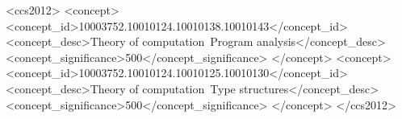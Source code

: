\documentclass[acmsmall,screen,review,anonymous,nonacm]{acmart}
\theoremstyle{acmdefinition}
\begin{document}
\begin{CCSXML}
<ccs2012>
<concept>
<concept_id>10003752.10010124.10010138.10010143</concept_id>
<concept_desc>Theory of computation~Program analysis</concept_desc>
<concept_significance>500</concept_significance>
</concept>
<concept>
<concept_id>10003752.10010124.10010125.10010130</concept_id>
<concept_desc>Theory of computation~Type structures</concept_desc>
<concept_significance>500</concept_significance>
</concept>
</ccs2012>
\end{CCSXML}



\maketitle






%
%



\appendix

\end{document}
